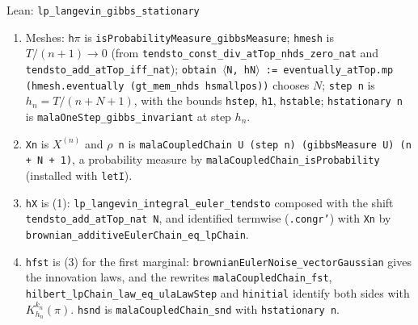 \documentclass[11pt,a4paper]{article}
\begin{document}
\begin{leanbox}{Lean: \texttt{lp\_\allowbreak{}langevin\_\allowbreak{}gibbs\_\allowbreak{}stationary}}
\begin{enumerate}
\item Meshes: \texttt{h\ensuremath{\pi}} is \texttt{is\allowbreak{}Probability\allowbreak{}Measure\_\allowbreak{}gibbs\allowbreak{}Measure}; \texttt{hmesh} is \(T/(n+1)\to0\) (from \texttt{tendsto\_\allowbreak{}const\_\allowbreak{}div\_\allowbreak{}at\allowbreak{}Top\_\allowbreak{}nhds\_\allowbreak{}zero\_\allowbreak{}nat} and \texttt{tendsto\_\allowbreak{}add\_\allowbreak{}at\allowbreak{}Top\_\allowbreak{}iff\_\allowbreak{}nat}); \texttt{obtain \ensuremath{\langle}N, h\allowbreak{}N\ensuremath{\rangle} := eventually\_\allowbreak{}at\allowbreak{}Top.\allowbreak{}mp (hmesh.\allowbreak{}eventually (gt\_\allowbreak{}mem\_\allowbreak{}nhds hsmallpos))} chooses \(N\); \texttt{step n} is \(h_n=T/(n+N+1)\), with the bounds \texttt{hstep}, \texttt{h1}, \texttt{hstable}; \texttt{hstationary n} is \texttt{mala\allowbreak{}One\allowbreak{}Step\_\allowbreak{}gibbs\_\allowbreak{}invariant} at step \(h_n\).

\item \texttt{Xn} is \(X^{(n)}\) and \texttt{\ensuremath{\rho} n} is \texttt{mala\allowbreak{}Coupled\allowbreak{}Chain U (step n) (gibbs\allowbreak{}Measure U) (n + N + 1)}, a probability measure by \texttt{mala\allowbreak{}Coupled\allowbreak{}Chain\_\allowbreak{}is\allowbreak{}Probability} (installed with \texttt{let\allowbreak{}I}).

\item \texttt{h\allowbreak{}X} is (1): \texttt{lp\_\allowbreak{}langevin\_\allowbreak{}integral\_\allowbreak{}euler\_\allowbreak{}tendsto} composed with the shift \texttt{tendsto\_\allowbreak{}add\_\allowbreak{}at\allowbreak{}Top\_\allowbreak{}nat N}, and identified termwise (\texttt{.\allowbreak{}congr'}) with \texttt{Xn} by \texttt{brownian\_\allowbreak{}additive\allowbreak{}Euler\allowbreak{}Chain\_\allowbreak{}eq\_\allowbreak{}lp\allowbreak{}Chain}.

\item \texttt{hfst} is (3) for the first marginal: \texttt{brownian\allowbreak{}Euler\allowbreak{}Noise\_\allowbreak{}vector\allowbreak{}Gaussian} gives the innovation laws, and the rewrites \texttt{mala\allowbreak{}Coupled\allowbreak{}Chain\_\allowbreak{}fst}, \texttt{hilbert\_\allowbreak{}lp\allowbreak{}Chain\_\allowbreak{}law\_\allowbreak{}eq\_\allowbreak{}ula\allowbreak{}Law\allowbreak{}Step} and \texttt{hinitial} identify both sides with \(K_{h_n}^{k_n}(\pi)\). \texttt{hsnd} is \texttt{mala\allowbreak{}Coupled\allowbreak{}Chain\_\allowbreak{}snd} with \texttt{hstationary n}.


\end{enumerate}
\end{leanbox}
\end{document}
